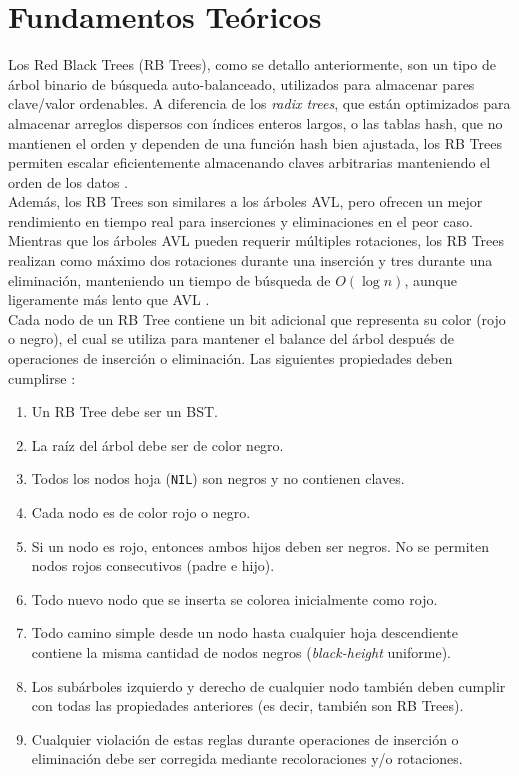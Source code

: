 \documentclass[conference]{IEEEtran}
\begin{document}


\section{Fundamentos Teóricos}

Los Red Black Trees (RB Trees), como se detallo anteriormente, son un tipo de árbol binario de búsqueda auto-balanceado, utilizados para almacenar pares clave/valor ordenables. A diferencia de los \textit{radix trees}, que están optimizados para almacenar arreglos dispersos con índices enteros largos, o las tablas hash, que no mantienen el orden y dependen de una función hash bien ajustada, los RB Trees permiten escalar eficientemente almacenando claves arbitrarias manteniendo el orden de los datos \cite{linuxrbtree}.\\

Además, los RB Trees son similares a los árboles AVL, pero ofrecen un mejor rendimiento en tiempo real para inserciones y eliminaciones en el peor caso. Mientras que los árboles AVL pueden requerir múltiples rotaciones, los RB Trees realizan como máximo dos rotaciones durante una inserción y tres durante una eliminación, manteniendo un tiempo de búsqueda de \( O(\log n) \), aunque ligeramente más lento que AVL \cite{linuxrbtree}.\\

Cada nodo de un RB Tree contiene un bit adicional que representa su color (rojo o negro), el cual se utiliza para mantener el balance del árbol después de operaciones de inserción o eliminación. Las siguientes propiedades deben cumplirse \cite{jaiswal2018}\cite{cormen2001}\cite{nguyen2019}:\\

\begin{enumerate}
    \item Un RB Tree debe ser un BST.
    \item La raíz del árbol debe ser de color negro.
    \item Todos los nodos hoja (\texttt{NIL}) son negros y no contienen claves.
    \item Cada nodo es de color rojo o negro.
    \item Si un nodo es rojo, entonces ambos hijos deben ser negros. No se permiten nodos rojos consecutivos (padre e hijo).
    \item Todo nuevo nodo que se inserta se colorea inicialmente como rojo.
    \item Todo camino simple desde un nodo hasta cualquier hoja descendiente contiene la misma cantidad de nodos negros (\textit{black-height} uniforme).
    \item Los subárboles izquierdo y derecho de cualquier nodo también deben cumplir con todas las propiedades anteriores (es decir, también son RB Trees).
    \item Cualquier violación de estas reglas durante operaciones de inserción o eliminación debe ser corregida mediante recoloraciones y/o rotaciones.
\end{enumerate}
\end{document}
